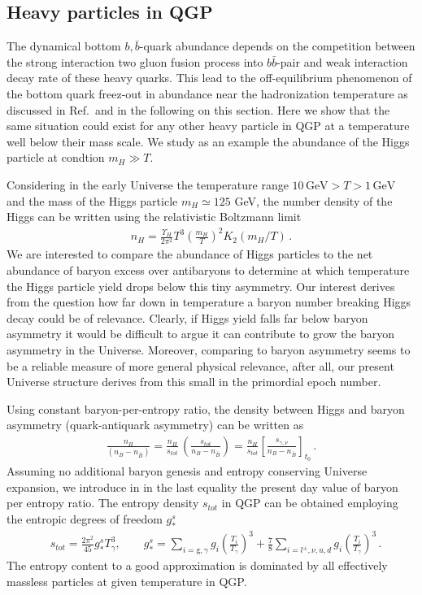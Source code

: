 \subsection{Heavy particles  in QGP}\label{HiggsQGP}
The dynamical bottom $ b,\bar b$-quark abundance depends on the competition between the strong interaction two gluon fusion process into $b\bar b$-pair and weak interaction decay rate of these heavy quarks. This lead to the off-equilibrium phenomenon of the bottom quark freez-out in abundance near the hadronization temperature as discussed in Ref.\,\cite{Yang:2020nne} and in the following on this section. Here we show that the same situation could exist for any other heavy particle in QGP at a temperature well below their mass scale. We study as an example the abundance of the Higgs particle at condtion $m_H\gg T$. 

Considering  in the early Universe the temperature range $10\,\mathrm{GeV}>T>1\,\mathrm{GeV}$ and the mass of the Higgs particle $m_H\simeq 125$ GeV, the number density of the Higgs can be written using the relativistic Boltzmann limit
\begin{align}
n_{H}=\frac{\Upsilon_H}{2\pi^2}T^3\left(\frac{m_H}{T}\right)^2 K_2(m_H/T)\,.
\end{align} 
We are interested to compare the abundance of Higgs particles to the net abundance of baryon excess over antibaryons to determine at which temperature the Higgs particle yield drops below this tiny asymmetry. Our interest derives from the question how far down in temperature a baryon number breaking Higgs decay could be of relevance. Clearly, if Higgs yield falls far below baryon asymmetry it would be difficult to argue it can contribute to grow the baryon asymmetry in the Universe. Moreover, comparing to baryon asymmetry seems to be a reliable measure of more general physical relevance, after all, our present Universe structure derives from this small in the primordial epoch number.

Using constant baryon-per-entropy ratio, the density between Higgs and baryon asymmetry (quark-antiquark asymmetry) can be written as
\begin{align}
\frac{n_H}{(n_B-n_{\bar{B}})}=\frac{n_{H}}{s_{tot}}\,\left(\frac{s_{tot}}{n_B-n_{\bar{B}}}\right)=
\frac{n_{H}}{s_{tot}}\left[\frac{s_{\gamma,\nu}}{n_B-n_{\bar{B}}}\right]_{t_0}\,.
\end{align}
Assuming no additional baryon genesis and entropy conserving Universe expansion, we introduce in  in the last equality the present day value of baryon per entropy ratio. The entropy density $s_{tot}$ in QGP can be obtained employing the entropic degrees of freedom $g^s_\ast$
\begin{align}
    &s_{tot}=\frac{2\pi^2}{45}g^s_\ast T_\gamma^3,\qquad g^s_\ast=\sum_{i=\mathrm{g},\gamma}g_i\left({\frac{T_i}{T_\gamma}}\right)^3+\frac{7}{8}\sum_{i=l^\pm,\nu,u,d}g_i\left({\frac{T_i}{T_\gamma}}\right)^3\,.
\end{align}
The entropy content to a good approximation is dominated by all effectively massless particles at given temperature in QGP. 

